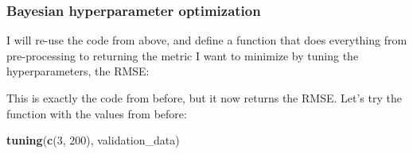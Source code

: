 \documentclass[]{gitbook}
\newenvironment{Shaded}{\begin{snugshade}}{\end{snugshade}}
\newcommand{\ControlFlowTok}[1]{\textcolor[rgb]{0.13,0.29,0.53}{\textbf{#1}}}
\newcommand{\DataTypeTok}[1]{\textcolor[rgb]{0.13,0.29,0.53}{#1}}
\newcommand{\DecValTok}[1]{\textcolor[rgb]{0.00,0.00,0.81}{#1}}
\newcommand{\KeywordTok}[1]{\textcolor[rgb]{0.13,0.29,0.53}{\textbf{#1}}}
\newcommand{\NormalTok}[1]{#1}
\newcommand{\OperatorTok}[1]{\textcolor[rgb]{0.81,0.36,0.00}{\textbf{#1}}}
\newcommand{\StringTok}[1]{\textcolor[rgb]{0.31,0.60,0.02}{#1}}
\theoremstyle{definition}
\theoremstyle{definition}
\theoremstyle{definition}
\theoremstyle{remark}
\begin{document}
\hypertarget{bayesian-hyperparameter-optimization}{%
\subsubsection{Bayesian hyperparameter
optimization}\label{bayesian-hyperparameter-optimization}}

I will re-use the code from above, and define a function that does
everything from pre-processing to returning the metric I want to
minimize by tuning the hyperparameters, the RMSE:

\begin{Shaded}
\end{Shaded}

This is exactly the code from before, but it now returns the RMSE. Let's
try the function with the values from before:

\begin{Shaded}
\begin{Highlighting}[]
\KeywordTok{tuning}\NormalTok{(}\KeywordTok{c}\NormalTok{(}\DecValTok{3}\NormalTok{, }\DecValTok{200}\NormalTok{), validation_data)}
\end{Highlighting}
\end{Shaded}
\end{document}
